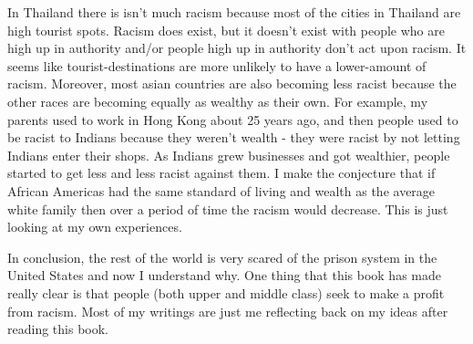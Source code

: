 \documentclass[11pt, oneside]{article}
\begin{document}
\par In Thailand there is isn't much racism because most of the cities in Thailand are high tourist spots. Racism does exist, but it doesn't exist with people who are high up in authority and/or people high up in authority don't act upon racism. It seems like tourist-destinations are more unlikely to have a lower-amount of racism. Moreover, most asian countries are also becoming less racist because the other races are becoming equally as wealthy as their own. For example, my parents used to work in Hong Kong about 25 years ago, and then people used to be racist to Indians because they weren't wealth - they were racist by not letting Indians enter their shops. As Indians grew businesses and got wealthier, people started to get less and less racist against them. I make the conjecture that if African Americas had the same standard of living and wealth as the average white family then over a period of time the racism would decrease. This is just looking at my own experiences. 
\par In conclusion, the rest of the world is very scared of the prison system in the United States and now I understand why. One thing that this book has made really clear is that people (both upper and middle class) seek to make a profit from racism. Most of my writings are just me reflecting back on my ideas after reading this book. 
\end{document}

